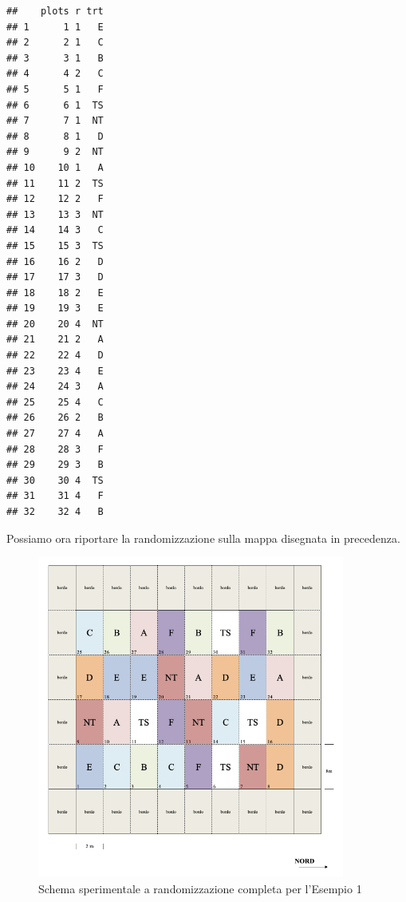 \documentclass[a4paper,12pt,oneside]{book}
\begin{document}
\begin{verbatim}
##    plots r trt
## 1      1 1   E
## 2      2 1   C
## 3      3 1   B
## 4      4 2   C
## 5      5 1   F
## 6      6 1  TS
## 7      7 1  NT
## 8      8 1   D
## 9      9 2  NT
## 10    10 1   A
## 11    11 2  TS
## 12    12 2   F
## 13    13 3  NT
## 14    14 3   C
## 15    15 3  TS
## 16    16 2   D
## 17    17 3   D
## 18    18 2   E
## 19    19 3   E
## 20    20 4  NT
## 21    21 2   A
## 22    22 4   D
## 23    23 4   E
## 24    24 3   A
## 25    25 4   C
## 26    26 2   B
## 27    27 4   A
## 28    28 3   F
## 29    29 3   B
## 30    30 4  TS
## 31    31 4   F
## 32    32 4   B
\end{verbatim}

Possiamo ora riportare la randomizzazione sulla mappa disegnata in
precedenza.

\begin{figure}
\centering
\includegraphics[width=0.90000\textwidth]{_images/Mappa1CRD.png}
\caption{Schema sperimentale a randomizzazione completa per l'Esempio 1}
\end{figure}
\end{document}
